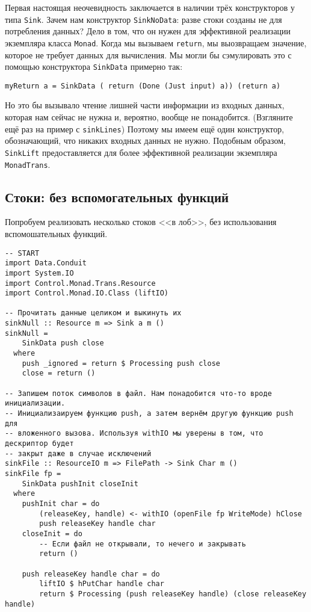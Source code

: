 {Первая настоящая неочевидность заключается в наличии трёх конструкторов у
типа \lstinline=Sink=. Зачем нам конструктор \lstinline=SinkNoData=: разве стоки
созданы не для потребления данных? Дело в том, что он нужен для эффективной реализации 
экземпляра класса \lstinline=Monad=. Когда мы вызываем \lstinline=return=, мы
выозвращаем значение, которое не требует данных для вычисления. Мы могли бы сэмулировать
это с помощью конструктора \lstinline=SinkData= примерно так:
\begin{lstlisting}
myReturn a = SinkData ( return (Done (Just input) a)) (return a)
\end{lstlisting}
Но это бы вызывало чтение лишней части информации из входных данных, которая нам сейчас не нужна и,
вероятно, вообще не понадобится. (Взгляните ещё раз на пример с \lstinline=sinkLines=)
Поэтому мы имеем ещё один конструктор, обозначающий, что никаких входных данных не нужно.
Подобным образом, \lstinline=SinkLift= предоставляется для более эффективной реализации
экземпляра \lstinline=MonadTrans=.

\subsection{Стоки: без вспомогательных функций}
Попробуем реализовать несколько стоков <<в лоб>>, без использования вспомошательных функций.
\begin{lstlisting}
-- START
import Data.Conduit
import System.IO
import Control.Monad.Trans.Resource
import Control.Monad.IO.Class (liftIO)

-- Прочитать данные целиком и выкинуть их
sinkNull :: Resource m => Sink a m ()
sinkNull =
    SinkData push close
  where
    push _ignored = return $ Processing push close
    close = return ()

-- Запишем поток символов в файл. Нам понадобится что-то вроде инициализации.
-- Инициализаируем функцию push, а затем вернём другую функцию push для 
-- вложенного вызова. Используя withIO мы уверены в том, что дескриптор будет 
-- закрыт даже в случае исключений
sinkFile :: ResourceIO m => FilePath -> Sink Char m ()
sinkFile fp =
    SinkData pushInit closeInit
  where
    pushInit char = do
        (releaseKey, handle) <- withIO (openFile fp WriteMode) hClose
        push releaseKey handle char
    closeInit = do
        -- Если файл не открывали, то нечего и закрывать
        return ()

    push releaseKey handle char = do
        liftIO $ hPutChar handle char
        return $ Processing (push releaseKey handle) (close releaseKey handle)


\end{lstlisting}}
